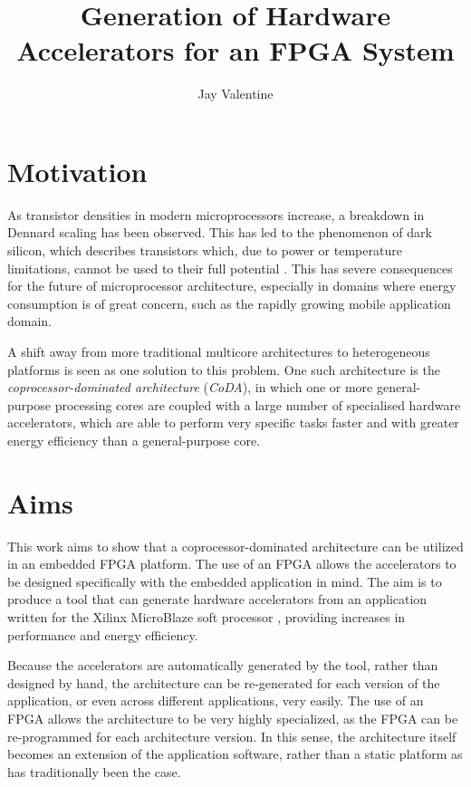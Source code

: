 \documentclass{UoYCSproject}
\begin{document}
\title{Generation of Hardware Accelerators for an FPGA System}
\author{Jay Valentine}

\maketitle

\listoffigures
\listoftables

\begin{summary}

\section{Motivation}

As transistor densities in modern microprocessors increase, a breakdown in Dennard scaling \cite{dennard} has been
observed. This has led to the phenomenon of dark silicon, which describes transistors which, due to power or temperature
limitations, cannot be used to their full potential \cite{darksilicon}. This has severe consequences for the future of
microprocessor architecture, especially in domains where energy consumption is of great concern, such as the rapidly growing
mobile application domain.

A shift away from more traditional multicore architectures to heterogeneous platforms is seen as one solution to this problem.
One such architecture is the \textit{coprocessor-dominated architecture} (\textit{CoDA}), in which one or more general-purpose
processing cores are coupled with a large number of specialised hardware accelerators, which are able to perform very specific
tasks faster and with greater energy efficiency than a general-purpose core.

\section{Aims}

This work aims to show that a coprocessor-dominated architecture can be utilized in an embedded FPGA platform.
The use of an FPGA allows the accelerators to be designed specifically with the embedded application in mind.
The aim is to produce a tool that can generate hardware accelerators from an application written for the Xilinx MicroBlaze
soft processor \cite{microblaze}, providing increases in performance and energy efficiency.

Because the accelerators are automatically generated by the tool, rather than designed by hand, the architecture
can be re-generated for each version of the application, or even across different applications, very easily.
The use of an FPGA allows the architecture to be very highly specialized, as the FPGA can be re-programmed for each architecture
version. In this sense, the architecture itself becomes an extension of the application software, rather than a static
platform as has traditionally been the case.


\end{summary}
\end{document}
